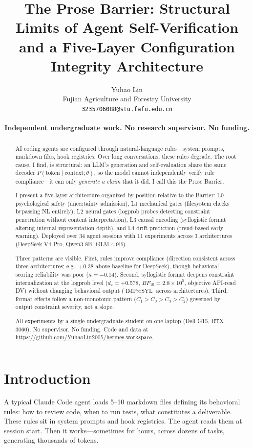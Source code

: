\documentclass[11pt]{article}
\title{The Prose Barrier: Structural Limits of Agent Self-Verification \\
  and a Five-Layer Configuration Integrity Architecture}
\author{Yuhao Lin \\
  Fujian Agriculture and Forestry University \\
  \texttt{3235706088@stu.fafu.edu.cn} \\\\
  \textbf{Independent undergraduate work. No research supervisor. No funding.}}
\begin{document}
\maketitle

\begin{abstract}
AI coding agents are configured through natural-language rules---system prompts,
markdown files, hook registries. Over long conversations, these rules degrade.
The root cause, I find, is structural: an LLM's generation and self-evaluation
share the same decoder $P(\text{token} \mid \text{context}; \theta)$, so the
model cannot independently verify rule compliance---it can only \textit{generate
a claim} that it did. I call this the Prose Barrier.

I present a five-layer architecture organized by position relative to the
Barrier: L0 psychological safety (uncertainty admission), L1 mechanical gates
(filesystem checks bypassing NL entirely), L2 neural gates (logprob probes
detecting constraint penetration without content interpretation), L3 causal
encoding (syllogistic format altering internal representation depth), and L4
drift prediction (trend-based early warning). Deployed over 34 agent sessions
with 11 experiments across 3 architectures (DeepSeek V4 Pro, Qwen3-8B, GLM-4-9B).

Three patterns are visible. First, rules improve compliance (direction
consistent across three architectures; e.g., $+0.38$ above baseline for DeepSeek),
though behavioral scoring reliability was poor
($\kappa=-0.14$). Second, syllogistic format deepens constraint internalization
at the logprob level ($d_z{=}+0.578$, $BF_{10}{=}2.8{\times}10^5$, objective
API-read DV) without changing behavioral output ($\text{IMP}{\approx}\text{SYL}$
across architectures). Third, format effects follow a non-monotonic pattern
($C_1 > C_0 > C_3 > C_2$) governed by output constraint severity, not a slope.

All experiments by a single undergraduate student on one laptop (Dell G15,
RTX 3060). No supervisor. No funding. Code and data at
\url{https://github.com/YuhaoLin2005/hermes-workspace}.
\end{abstract}

\section{Introduction}

A typical Claude Code agent loads 5--10 markdown files defining its behavioral
rules: how to review code, when to run tests, what constitutes a deliverable.
These rules sit in system prompts and hook registries. The agent reads them at
session start. Then it works---sometimes for hours, across dozens of tasks,
generating thousands of tokens.
\end{document}
